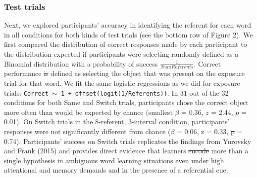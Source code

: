 \documentclass[authoryear, review]{elsarticle}
\providecommand{\DIFaddtex}[1]{{\protect\color{blue}\uwave{#1}}} %
\providecommand{\DIFdeltex}[1]{{\protect\color{red}\sout{#1}}}                      %
\providecommand{\DIFaddbegin}{} %
\providecommand{\DIFaddend}{} %
\providecommand{\DIFdelbegin}{} %
\providecommand{\DIFdelend}{} %
\providecommand{\DIFadd}[1]{\texorpdfstring{\DIFaddtex{#1}}{#1}} %
\providecommand{\DIFdel}[1]{\texorpdfstring{\DIFdeltex{#1}}{}} %
\begin{document}
\subsubsection{Test trials}\label{test-trials}

Next, we explored participants' accuracy in identifying the referent for
each word in all conditions for both kinds of test trials (see the
bottom row of Figure 2). We first compared the distribution of correct
responses made by each participant to the distribution expected if
participants were selecting randomly defined as a Binomial distribution
with a probability of success \(\frac{1}{Num Referents}\). Correct
performance \DIFdelbegin \DIFdel{is }\DIFdelend \DIFaddbegin \DIFadd{was }\DIFaddend defined as selecting the object that was present on the
exposure trial for that word. We fit the same logistic regressions as we
did for exposure trials:
\texttt{Correct $\sim$ 1 + offset(logit(1/Referents))}. In 31 out of the
32 conditions for both Same and Switch trials, participants chose the
correct object more often than would be expected by chance (smallest
\(\beta\) = 0.36, \(z\) = 2.44, \(p\) = 0.01). On Switch trials in the
8-referent, 3-interval condition, participants' responses were not
significantly different from chance (\(\beta\) = 0.06, z = 0.33, \DIFdelbegin \DIFdel{p }\DIFdelend \DIFaddbegin \DIFadd{\(p\) }\DIFaddend =
0.74). Participants' success on Switch trials replicates the findings
from Yurovsky and Frank (2015) and provides direct evidence that
learners \DIFdelbegin \DIFdel{encode }\DIFdelend \DIFaddbegin \DIFadd{encoded }\DIFaddend more than a single hypothesis in ambiguous word
learning situations even under high attentional and memory demands and
in the presence of a referential cue.
\end{document}
